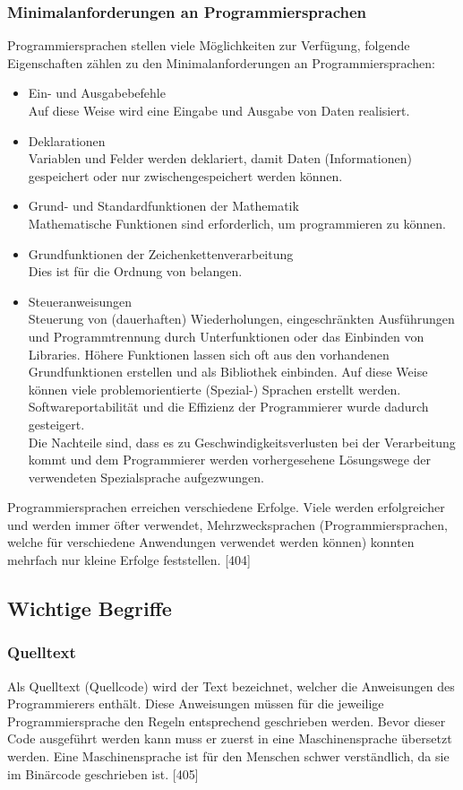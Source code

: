 \documentclass[12pt,a4paper]{report}
\begin{document}
\begin{onehalfspace}
\subsubsection{Minimalanforderungen an Programmiersprachen}
Programmiersprachen stellen viele Möglichkeiten zur Verfügung, folgende Eigenschaften zählen zu den Minimalanforderungen an Programmiersprachen:
\begin{itemize}
\item Ein- und Ausgabebefehle\\
Auf diese Weise wird eine Eingabe und Ausgabe von Daten realisiert.
\item Deklarationen\\
Variablen und Felder werden deklariert, damit Daten (Informationen) gespeichert oder nur zwischengespeichert werden können.
\item Grund- und Standardfunktionen der Mathematik\\
Mathematische Funktionen sind erforderlich, um programmieren zu können.
\item Grundfunktionen der Zeichenkettenverarbeitung\\
Dies ist für die Ordnung von belangen.
\item Steueranweisungen\\
Steuerung von (dauerhaften) Wiederholungen, eingeschränkten Ausführungen und Programmtrennung durch Unterfunktionen oder das Einbinden von Libraries. Höhere Funktionen lassen sich oft aus den vorhandenen Grundfunktionen erstellen und als Bibliothek einbinden. Auf diese Weise können viele problemorientierte (Spezial-) Sprachen erstellt werden. Softwareportabilität und die Effizienz der Programmierer wurde dadurch gesteigert.\\
Die Nachteile sind, dass es zu Geschwindigkeitsverlusten bei der Verarbeitung kommt und dem Programmierer werden vorhergesehene Lösungswege der verwendeten Spezialsprache aufgezwungen.
\end{itemize}
Programmiersprachen erreichen verschiedene Erfolge. Viele werden erfolgreicher und werden immer öfter verwendet,  Mehrzwecksprachen (Programmiersprachen, welche für verschiedene Anwendungen verwendet werden können) konnten mehrfach nur kleine Erfolge feststellen. [404]

\subsection{Wichtige Begriffe}
\subsubsection{Quelltext}
Als Quelltext (Quellcode) wird der Text bezeichnet, welcher die Anweisungen des Programmierers enthält. Diese Anweisungen müssen für die jeweilige Programmiersprache den Regeln entsprechend geschrieben werden. Bevor dieser Code ausgeführt werden kann muss er zuerst in eine Maschinensprache übersetzt werden. Eine Maschinensprache ist für den Menschen schwer verständlich, da sie im Binärcode geschrieben ist. [405]


\end{onehalfspace}
\end{document}
